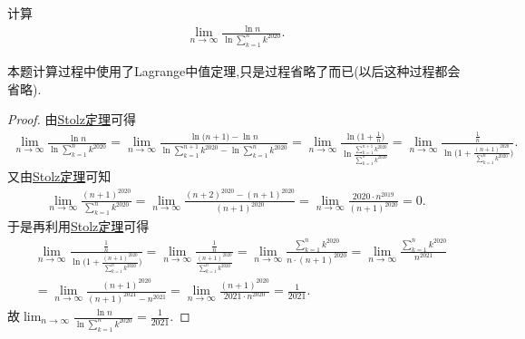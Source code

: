 \documentclass[../../main.tex]{subfiles}%
\begin{document}
\begin{example}
计算
\begin{align*}
\lim_{n \to \infty} \frac{\ln n}{\ln \sum\limits_{k = 1}^{n} k^{2020}}.
\end{align*}
\end{example}
\begin{note}
本题计算过程中使用了Lagrange中值定理,只是过程省略了而已(以后这种过程都会省略).
\end{note}
\begin{proof}
由\hyperref[theorem:Stolz定理]{Stolz定理}可得
\begin{align*}
\lim_{n \to \infty} \frac{\ln n}{\ln \sum\limits_{k = 1}^{n} k^{2020}}=\lim_{n\rightarrow \infty} \frac{\ln\mathrm{(}n+1)-\ln n}{\ln \sum\limits_{k=1}^{n+1}{k^{2020}}-\ln \sum\limits_{k=1}^n{k^{2020}}}=\lim_{n\rightarrow \infty} \frac{\ln\mathrm{(}1+\frac{1}{n})}{\ln \frac{\sum\limits_{k=1}^{n+1}{k^{2020}}}{\sum\limits_{k=1}^n{k^{2020}}}}=\lim_{n\rightarrow \infty} \frac{\frac{1}{n}}{\ln\mathrm{(}1+\frac{(n+1)^{2020}}{\sum\limits_{k=1}^n{k^{2020}}})}.
\end{align*}
又由\hyperref[theorem:Stolz定理]{Stolz定理}可知
\begin{align*}
\lim_{n\rightarrow \infty} \frac{(n+1)^{2020}}{\sum\limits_{k=1}^n{k^{2020}}}=\lim_{n\rightarrow \infty} \frac{(n+2)^{2020}-(n+1)^{2020}}{(n+1)^{2020}}=\lim_{n\rightarrow \infty} \frac{2020\cdot n^{2019}}{(n+1)^{2020}}=0.
\end{align*}
于是再利用\hyperref[theorem:Stolz定理]{Stolz定理}可得
\begin{align*}
&\lim_{n\rightarrow \infty} \frac{\frac{1}{n}}{\ln\mathrm{(}1+\frac{(n+1)^{2020}}{\sum\limits_{k=1}^n{k^{2020}}})}=\lim_{n\rightarrow \infty} \frac{\frac{1}{n}}{\frac{(n+1)^{2020}}{\sum\limits_{k=1}^n{k^{2020}}}}=\lim_{n\rightarrow \infty} \frac{\sum\limits_{k=1}^n{k^{2020}}}{n\cdot (n+1)^{2020}}=\lim_{n\rightarrow \infty} \frac{\sum\limits_{k=1}^n{k^{2020}}}{n^{2021}}  \\
&=\lim_{n\rightarrow \infty} \frac{(n+1)^{2020}}{(n+1)^{2021}-n^{2021}}=\lim_{n\rightarrow \infty} \frac{(n+1)^{2020}}{2021\cdot n^{2020}}=\frac{1}{2021}.
\end{align*}
故$\lim_{n \to \infty} \frac{\ln n}{\ln \sum\limits_{k = 1}^{n} k^{2020}}=\frac{1}{2021}$.
\end{proof}
\end{document}
